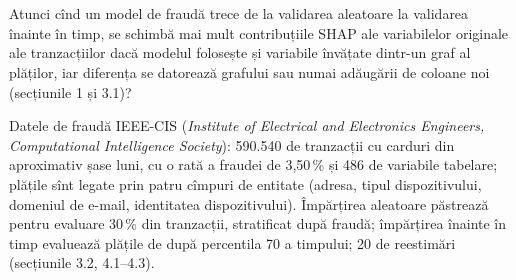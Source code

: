 \section{}
\textbf{} %
{Atunci cînd un model de fraudă trece de la validarea aleatoare la validarea înainte în timp, se schimbă mai mult contribuțiile SHAP ale variabilelor originale ale tranzacțiilor dacă modelul folosește și variabile învățate dintr-un graf al plăților, iar diferența se datorează grafului sau numai adăugării de coloane noi (secțiunile 1 și 3.1)?}

\textbf{} %
{Datele de fraudă IEEE-CIS (\emph{Institute of Electrical and Electronics Engineers, Computational Intelligence Society}): 590.540 de tranzacții cu carduri din aproximativ șase luni, cu o rată a fraudei de 3,50\,\% și 486 de variabile tabelare; plățile sînt legate prin patru cîmpuri de entitate (adresa, tipul dispozitivului, domeniul de e-mail, identitatea dispozitivului).
Împărțirea aleatoare păstrează pentru evaluare 30\,\% din tranzacții, stratificat după fraudă; împărțirea înainte în timp evaluează plățile de după percentila 70 a timpului; 20 de reestimări (secțiunile 3.2, 4.1--4.3).}

